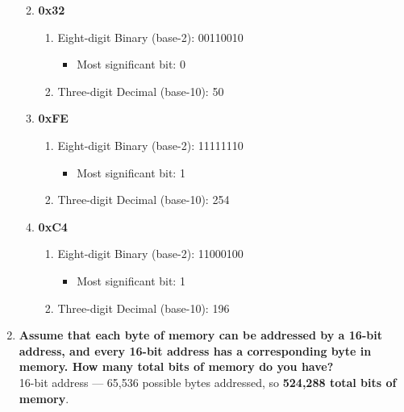 \documentclass{article}
\begin{document}
\begin{enumerate}[label=\textbf{\arabic*})]
\begin{enumerate}[label=\textbf{\alph*}.]
    \pagebreak
        
        \item \textbf{0x32}
        \begin{enumerate}
            \item Eight-digit Binary (base-2): 00110010
            \begin{itemize}
                \item Most significant bit: 0
            \end{itemize}
            \item Three-digit Decimal (base-10): 50
        \end{enumerate}
        
        \item \textbf{0xFE}
        \begin{enumerate}
            \item Eight-digit Binary (base-2): 11111110
            \begin{itemize}
                \item Most significant bit: 1
            \end{itemize}
            \item Three-digit Decimal (base-10): 254
        \end{enumerate}
        
        \item \textbf{0xC4}
        \begin{enumerate}
            \item Eight-digit Binary (base-2): 11000100
            \begin{itemize}
                \item Most significant bit: 1
            \end{itemize}
            \item Three-digit Decimal (base-10): 196
        \end{enumerate}
    \end{enumerate}
    
    \setcounter{enumi}{5}
    \item \textbf{Assume that each byte of memory can be addressed by a 16-bit address, and every 16-bit address has a corresponding byte in memory. How many total bits of memory do you have?} \\
    
    16-bit address --- 65,536 possible bytes addressed, so \textbf{524,288 total bits of memory}.
    

\end{enumerate}
\end{document}
